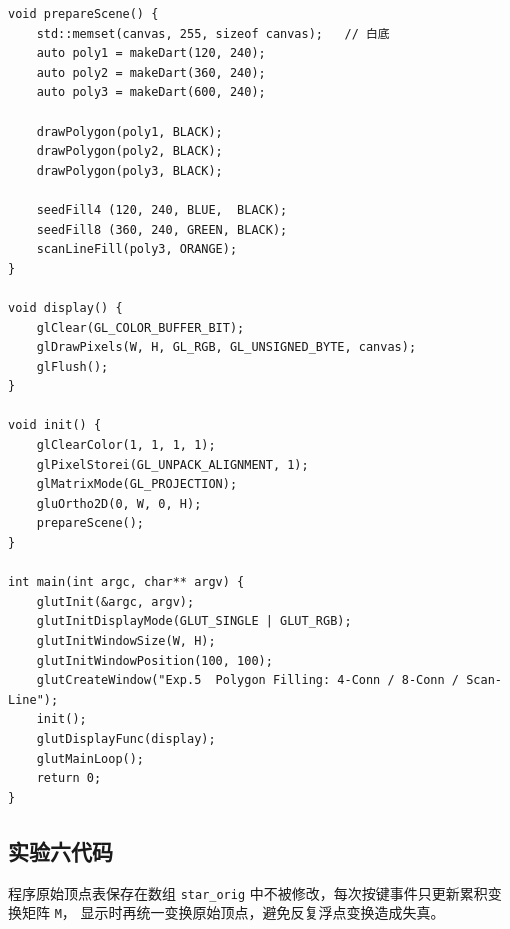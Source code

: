\documentclass[a4paper,12pt]{ctexart}
\begin{document}
\begin{lstlisting}[style=cppstyle,caption={多边形区域填充 —— 完整源代码}]
void prepareScene() {
    std::memset(canvas, 255, sizeof canvas);   // 白底
    auto poly1 = makeDart(120, 240);
    auto poly2 = makeDart(360, 240);
    auto poly3 = makeDart(600, 240);

    drawPolygon(poly1, BLACK);
    drawPolygon(poly2, BLACK);
    drawPolygon(poly3, BLACK);

    seedFill4 (120, 240, BLUE,  BLACK);
    seedFill8 (360, 240, GREEN, BLACK);
    scanLineFill(poly3, ORANGE);
}

void display() {
    glClear(GL_COLOR_BUFFER_BIT);
    glDrawPixels(W, H, GL_RGB, GL_UNSIGNED_BYTE, canvas);
    glFlush();
}

void init() {
    glClearColor(1, 1, 1, 1);
    glPixelStorei(GL_UNPACK_ALIGNMENT, 1);
    glMatrixMode(GL_PROJECTION);
    gluOrtho2D(0, W, 0, H);
    prepareScene();
}

int main(int argc, char** argv) {
    glutInit(&argc, argv);
    glutInitDisplayMode(GLUT_SINGLE | GLUT_RGB);
    glutInitWindowSize(W, H);
    glutInitWindowPosition(100, 100);
    glutCreateWindow("Exp.5  Polygon Filling: 4-Conn / 8-Conn / Scan-Line");
    init();
    glutDisplayFunc(display);
    glutMainLoop();
    return 0;
}
\end{lstlisting}

\subsection{实验六代码}

程序原始顶点表保存在数组 \texttt{star\_orig} 中不被修改，每次按键事件只更新累积变换矩阵 \texttt{M}，
显示时再统一变换原始顶点，避免反复浮点变换造成失真。
\end{document}
